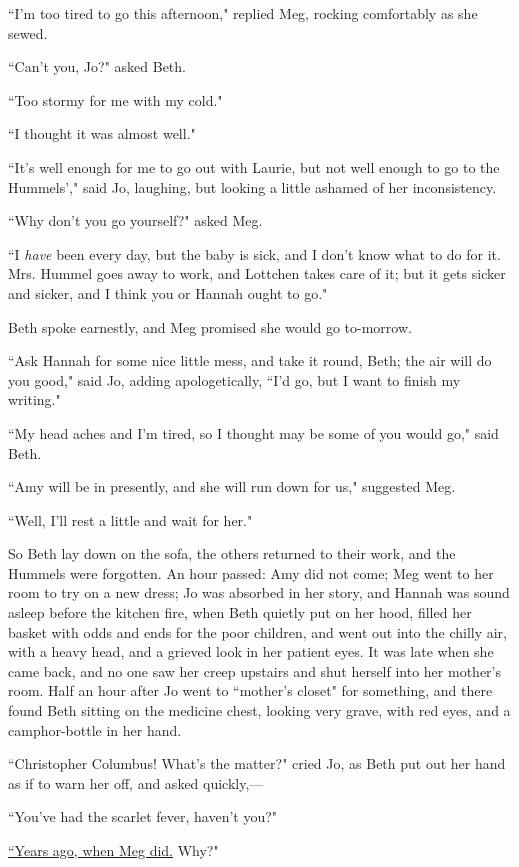 ``I'm too tired to go this afternoon," replied Meg,
rocking comfortably as she sewed.

``Can't you, Jo?" asked Beth.

``Too stormy for me with my cold."

``I thought it was almost well."

``It's well enough for me to go out with Laurie, but not
well enough to go to the Hummels'," said Jo, laughing,
but looking a little ashamed of her inconsistency.

``Why don't you go yourself?" asked Meg.

``I \emph{have} been every day, but the baby is sick, and I
don't know what to do for it. Mrs. Hummel goes away to
work, and Lottchen takes care of it; but it gets sicker and sicker, and
I think you or Hannah ought to go."

Beth spoke earnestly, and Meg promised she would go to-morrow.

``Ask Hannah for some nice little mess, and take it round, Beth; the air
will do you good," said Jo, adding apologetically, ``I'd
go, but I want to finish my writing."

``My head aches and I'm tired, so I thought may be some
of you would go," said Beth.

``Amy will be in presently, and she will run down for us," suggested Meg.

``Well, I'll rest a little and wait for her."

So Beth lay down on the sofa, the others returned to their work, and the
Hummels were forgotten. An hour passed: Amy did not come; Meg went to
her room to try on a new dress; Jo was absorbed in her story, and Hannah
was sound asleep before the kitchen fire, when Beth quietly put on her
hood, filled her basket with odds and ends for the poor children, and
went out into the chilly air, with a heavy head, and a grieved look in
her patient eyes. It was late when she came back, and no one saw her
creep upstairs and shut herself into her mother's room.
Half an hour after Jo went to ``mother's closet" for
something, and there found Beth sitting on the medicine chest, looking
very grave, with red eyes, and a camphor-bottle in her hand.

``Christopher Columbus! What's the matter?" cried Jo, as
Beth put out her hand as if to warn her off, and asked quickly,---

``You've had the scarlet fever, haven't
you?"

\underline{``Years ago, when Meg did.} Why?"

